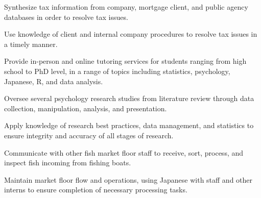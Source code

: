 \documentclass[letterpaper]{deedy-resume_sm} %
\begin{document}
\vspace{\topsep} %
\begin{tightitemize}
\item Synthesize tax information from company, mortgage client, and public agency databases in order to resolve tax issues.
\item Use knowledge of client and internal company procedures to resolve tax issues in a timely manner.
\end{tightitemize}
\sectionspace %
\vspace{\topsep} %
\begin{tightitemize}
\item Provide in-person and online tutoring services for students ranging from high school to PhD level, in a range of topics including statistics, psychology, Japanese, R, and data analysis.
\end{tightitemize}
\sectionspace %
\vspace{\topsep} %
\begin{tightitemize}
\item Oversee several psychology research studies from literature review through data collection, manipulation, analysis, and presentation. 
\item Apply knowledge of research best practices, data management, and statistics to ensure integrity and accuracy of all stages of research.
\end{tightitemize}
\sectionspace %
\vspace{\topsep} %
\begin{tightitemize}
\item Communicate with other fish market floor staff to receive, sort, process, and inspect fish incoming from fishing boats. 
\item Maintain market floor flow and operations, using Japanese with staff and other interns to ensure completion of necessary processing tasks.
\end{tightitemize}
\sectionspace %
\end{document}
